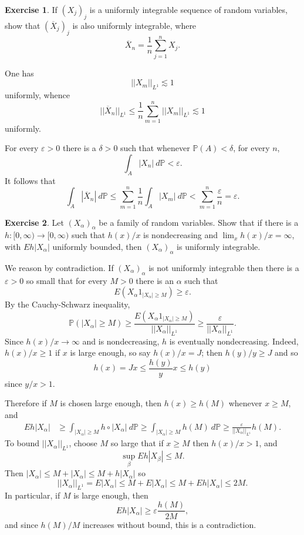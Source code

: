 \documentclass[10pt]{article}
\newcommand{\PP}{\mathbb P}
\theoremstyle{definition}
\newtheorem{exer}{Exercise}
\begin{document}
\begin{exer}
If $(X_j)_j$ is a uniformly integrable sequence of random variables, show that $(\overline X_j)_j$ is also uniformly integrable, where
$$\overline X_n = \frac{1}{n} \sum_{j=1}^n X_j.$$
\end{exer}

One has
$$||X_m||_{L^1} \lesssim 1$$
uniformly, whence
$$||\overline X_n||_{L^1} \leq \frac{1}{n} \sum_{m=1}^n ||X_m||_{L^1} \lesssim 1$$
uniformly.

For every $\varepsilon > 0$ there is a $\delta > 0$ such that whenever $\PP(A) < \delta$, for every $n$,
$$\int_A |X_n|~d\PP < \varepsilon.$$
It follows that
$$\int_A |\overline X_n|~d\PP \leq \sum_{m=1}^n \frac{1}{n} \int_A |X_m|~d\PP < \sum_{m=1}^n \frac{\varepsilon}{n} = \varepsilon.$$

\begin{exer}
Let $(X_\alpha)_\alpha$ be a family of random variables. Show that if there is a $h: [0, \infty) \to [0, \infty)$ such that $h(x)/x$ is nondecreasing and $\lim_x h(x)/x = \infty$, with $Eh|X_\alpha|$ uniformly bounded, then $(X_\alpha)_\alpha$ is uniformly integrable.
\end{exer}

We reason by contradiction.
If $(X_\alpha)_\alpha$ is not uniformly integrable then there is a $\varepsilon > 0$ so small that for every $M > 0$ there is an $\alpha$ such that
$$E(X_{\alpha} 1_{|X_{\alpha}| \geq M}) \geq \varepsilon.$$
By the Cauchy-Schwarz inequality,
$$\PP(|X_\alpha| \geq M) \geq \frac{E(X_{\alpha} 1_{|X_{\alpha}| \geq M})}{||X_\alpha||_{L^1}} \geq \frac{\varepsilon}{||X_\alpha||_{L^1}}.$$
Since $h(x)/x \to \infty$ and is nondecreasing, $h$ is eventually nondecreasing.
Indeed, $h(x)/x \geq 1$ if $x$ is large enough, so say $h(x)/x = J$; then $h(y)/y \geq J$ and so
$$h(x) = Jx \leq \frac{h(y)}{y}x \leq h(y)$$
since $y/x > 1$.

Therefore if $M$ is chosen large enough, then $h(x) \geq h(M)$ whenever $x \geq M$, and
\begin{align*}
Eh|X_{\alpha}| &\geq \int_{|X_{\alpha}| \geq M} h \circ |X_{\alpha}| ~d\PP \geq \int_{|X_\alpha| \geq M} h(M)~d\PP \geq \frac{\varepsilon}{||X_\alpha||_{L^1}} h(M).
\end{align*}
To bound $||X_\alpha||_{L^1}$, choose $M$ so large that if $x \geq M$ then $h(x)/x > 1$, and
$$\sup_\beta Eh|X_\beta| \leq M.$$
Then $|X_\alpha| \leq M + |X_\alpha| \leq M + h|X_\alpha|$ so
$$||X_\alpha||_{L^1} = E|X_\alpha| \leq M + E|X_\alpha| \leq M + Eh|X_\alpha| \leq 2M.$$
In particular, if $M$ is large enough, then
$$Eh|X_\alpha| \geq \varepsilon \frac{h(M)}{2M},$$
and since $h(M)/M$ increases without bound, this is a contradiction.
\end{document}
